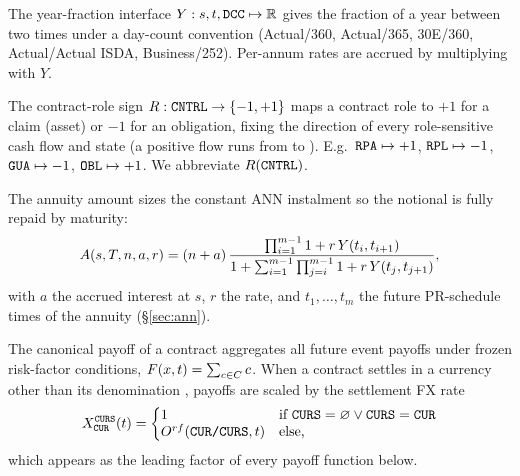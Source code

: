 \begin{definition}\label{def:yearFraction}
        \leanok
        The year-fraction interface $Y:s,t,\texttt{DCC}\mapsto\mathbb{R}$ gives the
        fraction of a year between two times under a day-count convention
         (Actual/360, Actual/365, 30E/360, Actual/Actual ISDA,
        Business/252).  Per-annum rates are accrued by multiplying with $Y$.
\end{definition}

\begin{definition}\label{def:sign}
        \leanok
        The contract-role sign $R:\texttt{CNTRL}\to\{-1,+1\}$ maps a contract role
        to $+1$ for a claim (asset) or $-1$ for an obligation, fixing the
        direction of every role-sensitive cash flow and state (a positive flow
        runs from  to ).  E.g.\ $\texttt{RPA}\mapsto+1$,
        $\texttt{RPL}\mapsto-1$, $\texttt{GUA}\mapsto-1$, $\texttt{OBL}\mapsto+1$.  We
        abbreviate $R(\texttt{CNTRL})$.
\end{definition}

\begin{definition}\label{def:annuity}
        \leanok
        The annuity amount sizes the constant ANN instalment so the notional is
        fully repaid by maturity:
        \[
          A(s,T,n,a,r)=(n+a)\,
            \frac{\prod_{i=1}^{m-1}1+r\,Y(t_i,t_{i+1})}
                 {1+\sum_{i=1}^{m-1}\prod_{j=i}^{m-1}1+r\,Y(t_j,t_{j+1})},
        \]
        with $a$ the accrued interest at $s$, $r$ the rate, and $t_1,\dots,t_m$
        the future PR-schedule times of the annuity (\S\ref{sec:ann}).
\end{definition}

\begin{definition}\label{def:settlement}
        The canonical payoff of a contract aggregates all future event payoffs
        under frozen risk-factor conditions, $F(x,t)=\sum_{c\in C}c$.
        When a contract settles in a currency  other than its
        denomination , payoffs are scaled by the settlement FX rate
        \[
          X_{\attr{CUR}}^{\attr{CURS}}(t)=\left\{\begin{array}{@{}l@{\quad}l@{}}
            1 & \text{if } \attr{CURS}=\nul \lor \attr{CURS}=\attr{CUR}\\
            \obs{rf}{\attr{CUR/CURS}}{t} & \text{else,}
          \end{array}\right.
        \]
        which appears as the leading factor of every payoff function below.
\end{definition}

